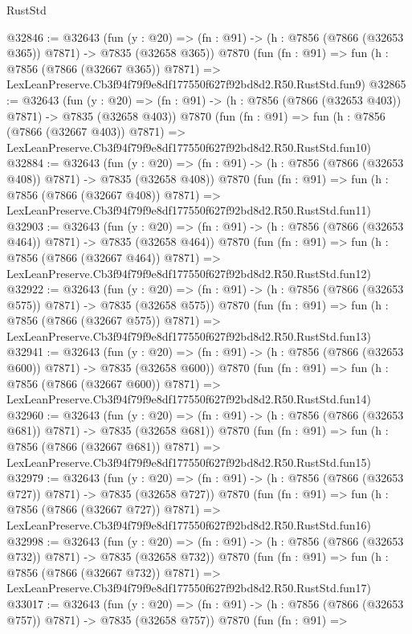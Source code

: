 \begin{lexlean}{RustStd}
\begin{coremodule}
@32846 := @32643
    (fun (y : @20) => (fn : @91) -> (h : @7856 (@7866 (@32653 @365)) @7871) -> @7835 (@32658 @365))
    @7870
    (fun (fn : @91) =>
    fun (h : @7856 (@7866 (@32667 @365)) @7871) =>
    LexLeanPreserve.Cb3f94f79f9e8df177550f627f92bd8d2.R50.RustStd.fun9)
@32865 := @32643
    (fun (y : @20) => (fn : @91) -> (h : @7856 (@7866 (@32653 @403)) @7871) -> @7835 (@32658 @403))
    @7870
    (fun (fn : @91) =>
    fun (h : @7856 (@7866 (@32667 @403)) @7871) =>
    LexLeanPreserve.Cb3f94f79f9e8df177550f627f92bd8d2.R50.RustStd.fun10)
@32884 := @32643
    (fun (y : @20) => (fn : @91) -> (h : @7856 (@7866 (@32653 @408)) @7871) -> @7835 (@32658 @408))
    @7870
    (fun (fn : @91) =>
    fun (h : @7856 (@7866 (@32667 @408)) @7871) =>
    LexLeanPreserve.Cb3f94f79f9e8df177550f627f92bd8d2.R50.RustStd.fun11)
@32903 := @32643
    (fun (y : @20) => (fn : @91) -> (h : @7856 (@7866 (@32653 @464)) @7871) -> @7835 (@32658 @464))
    @7870
    (fun (fn : @91) =>
    fun (h : @7856 (@7866 (@32667 @464)) @7871) =>
    LexLeanPreserve.Cb3f94f79f9e8df177550f627f92bd8d2.R50.RustStd.fun12)
@32922 := @32643
    (fun (y : @20) => (fn : @91) -> (h : @7856 (@7866 (@32653 @575)) @7871) -> @7835 (@32658 @575))
    @7870
    (fun (fn : @91) =>
    fun (h : @7856 (@7866 (@32667 @575)) @7871) =>
    LexLeanPreserve.Cb3f94f79f9e8df177550f627f92bd8d2.R50.RustStd.fun13)
@32941 := @32643
    (fun (y : @20) => (fn : @91) -> (h : @7856 (@7866 (@32653 @600)) @7871) -> @7835 (@32658 @600))
    @7870
    (fun (fn : @91) =>
    fun (h : @7856 (@7866 (@32667 @600)) @7871) =>
    LexLeanPreserve.Cb3f94f79f9e8df177550f627f92bd8d2.R50.RustStd.fun14)
@32960 := @32643
    (fun (y : @20) => (fn : @91) -> (h : @7856 (@7866 (@32653 @681)) @7871) -> @7835 (@32658 @681))
    @7870
    (fun (fn : @91) =>
    fun (h : @7856 (@7866 (@32667 @681)) @7871) =>
    LexLeanPreserve.Cb3f94f79f9e8df177550f627f92bd8d2.R50.RustStd.fun15)
@32979 := @32643
    (fun (y : @20) => (fn : @91) -> (h : @7856 (@7866 (@32653 @727)) @7871) -> @7835 (@32658 @727))
    @7870
    (fun (fn : @91) =>
    fun (h : @7856 (@7866 (@32667 @727)) @7871) =>
    LexLeanPreserve.Cb3f94f79f9e8df177550f627f92bd8d2.R50.RustStd.fun16)
@32998 := @32643
    (fun (y : @20) => (fn : @91) -> (h : @7856 (@7866 (@32653 @732)) @7871) -> @7835 (@32658 @732))
    @7870
    (fun (fn : @91) =>
    fun (h : @7856 (@7866 (@32667 @732)) @7871) =>
    LexLeanPreserve.Cb3f94f79f9e8df177550f627f92bd8d2.R50.RustStd.fun17)
@33017 := @32643
    (fun (y : @20) => (fn : @91) -> (h : @7856 (@7866 (@32653 @757)) @7871) -> @7835 (@32658 @757))
    @7870
    (fun (fn : @91) =>

\end{coremodule}
\end{lexlean}
